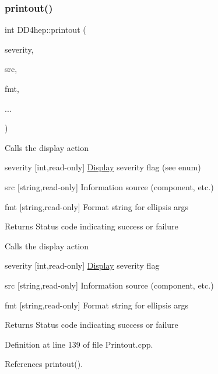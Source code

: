 \hypertarget{namespace_d_d4hep_a335f9a94367d028c2719a77bfccfb2d2}{}\label{namespace_d_d4hep_a335f9a94367d028c2719a77bfccfb2d2} 
\subsubsection{\texorpdfstring{printout()}{printout()}\hspace{0.1cm}{\footnotesize\ttfamily [3/8]}}
{\footnotesize\ttfamily int D\+D4hep\+::printout (\begin{DoxyParamCaption}\item[{\hyperlink{namespace_d_d4hep_a5b5a64d56252469451f2020a27d57d42}{Print\+Level}}]{severity,  }\item[{const std\+::string \&}]{src,  }\item[{const std\+::string \&}]{fmt,  }\item[{}]{... }\end{DoxyParamCaption})}

Calls the display action \begin{DoxyItemize}
\item severity \mbox{[}int,read-\/only\mbox{]} \hyperlink{class_d_d4hep_1_1_display}{Display} severity flag (see enum) \item src \mbox{[}string,read-\/only\mbox{]} Information source (component, etc.) \item fmt \mbox{[}string,read-\/only\mbox{]} Format string for ellipsis args \begin{DoxyReturn}{Returns}
Status code indicating success or failure
\end{DoxyReturn}
Calls the display action \item severity \mbox{[}int,read-\/only\mbox{]} \hyperlink{class_d_d4hep_1_1_display}{Display} severity flag \item src \mbox{[}string,read-\/only\mbox{]} Information source (component, etc.) \item fmt \mbox{[}string,read-\/only\mbox{]} Format string for ellipsis args \begin{DoxyReturn}{Returns}
Status code indicating success or failure 
\end{DoxyReturn}
\end{DoxyItemize}


Definition at line 139 of file Printout.\+cpp.



References printout().


